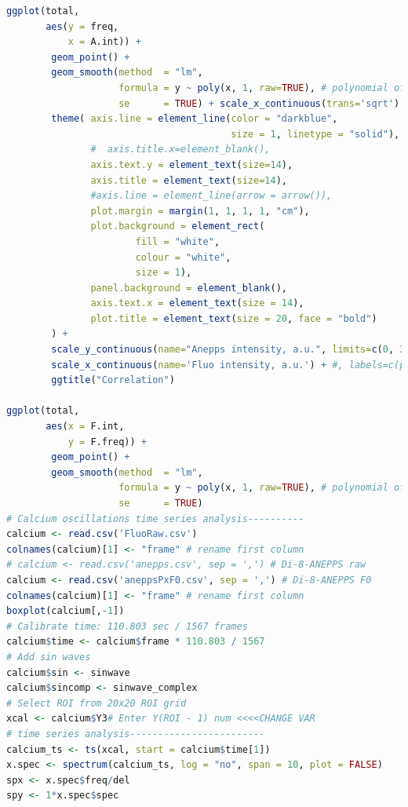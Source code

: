 \documentclass{biophys-new}
\begin{document}
\begin{lstlisting}[language=R]
ggplot(total,
       aes(y = freq,
           x = A.int)) +
        geom_point() +
        geom_smooth(method  = "lm",
                    formula = y ~ poly(x, 1, raw=TRUE), # polynomial of 1
                    se      = TRUE) + scale_x_continuous(trans='sqrt') +
        theme( axis.line = element_line(color = "darkblue",
                                        size = 1, linetype = "solid"),
               #  axis.title.x=element_blank(),
               axis.text.y = element_text(size=14),
               axis.title = element_text(size=14),
               #axis.line = element_line(arrow = arrow()),
               plot.margin = margin(1, 1, 1, 1, "cm"),
               plot.background = element_rect(
                       fill = "white",
                       colour = "white",
                       size = 1),
               panel.background = element_blank(),
               axis.text.x = element_text(size = 14),
               plot.title = element_text(size = 20, face = "bold")
        ) +
        scale_y_continuous(name="Anepps intensity, a.u.", limits=c(0, 3)) +
        scale_x_continuous(name='Fluo intensity, a.u.') + #, labels=c(paste(1:40))
        ggtitle("Correlation")

ggplot(total,
       aes(x = F.int,
           y = F.freq)) +
        geom_point() +
        geom_smooth(method  = "lm",
                    formula = y ~ poly(x, 1, raw=TRUE), # polynomial of 1
                    se      = TRUE)
# Calcium oscillations time series analysis----------
calcium <- read.csv('FluoRaw.csv')
colnames(calcium)[1] <- "frame" # rename first column
# calcium <- read.csv('anepps.csv', sep = ',') # Di-8-ANEPPS raw
calcium <- read.csv('aneppsPxF0.csv', sep = ',') # Di-8-ANEPPS F0
colnames(calcium)[1] <- "frame" # rename first column
boxplot(calcium[,-1])
# Calibrate time: 110.803 sec / 1567 frames
calcium$time <- calcium$frame * 110.803 / 1567
# Add sin waves
calcium$sin <- sinwave
calcium$sincomp <- sinwave_complex
# Select ROI from 20x20 ROI grid
xcal <- calcium$Y3# Enter Y(ROI - 1) num <<<<CHANGE VAR
# time series analysis------------------------
calcium_ts <- ts(xcal, start = calcium$time[1])
x.spec <- spectrum(calcium_ts, log = "no", span = 10, plot = FALSE)
spx <- x.spec$freq/del
spy <- 1*x.spec$spec


\end{lstlisting}
\end{document}
